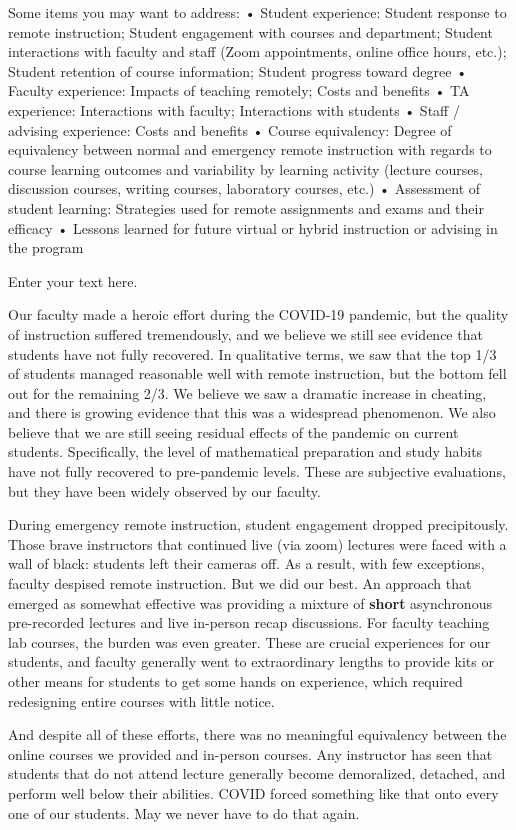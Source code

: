 \documentclass[12pt]{article}
\begin{document}
Some items you may want to address:
    • Student experience: Student response to remote instruction; Student engagement with courses and department; Student interactions with faculty and staff (Zoom appointments, online office hours, etc.); Student retention of course information; Student progress toward degree
    • Faculty experience: Impacts of teaching remotely; Costs and benefits
    • TA experience: Interactions with faculty; Interactions with students
    • Staff / advising experience: Costs and benefits
    • Course equivalency: Degree of equivalency between normal and emergency remote instruction with regards to course learning outcomes and variability by learning activity (lecture courses, discussion courses, writing courses, laboratory courses, etc.)
    • Assessment of student learning: Strategies used for remote assignments and exams and their efficacy
    • Lessons learned for future virtual or hybrid instruction or advising in the program

Enter your text here.

Our faculty made a heroic effort during the COVID-19 pandemic, but the quality of instruction suffered tremendously, and we believe we still see evidence that students have not fully recovered.  In qualitative terms, we saw that the top 1/3 of students managed reasonable well with remote instruction, but the bottom fell out for the remaining 2/3.  We believe we saw a dramatic increase in cheating, and there is growing evidence that this was a widespread phenomenon.  We also believe that we are still seeing residual effects of the pandemic on current students.  Specifically, the level of mathematical preparation and study habits have not fully recovered to pre-pandemic levels.  These are subjective evaluations, but they have been widely observed by our faculty.

During emergency remote instruction, student engagement dropped precipitously.  Those brave instructors that continued live (via zoom) lectures were faced with a wall of black: students left their cameras off.  As a result, with few exceptions, faculty despised remote instruction.  But we did our best.  An approach that emerged as somewhat effective was providing a mixture of {\bf short} asynchronous pre-recorded lectures and live in-person recap discussions.  For faculty teaching lab courses, the burden was even greater.  These are crucial experiences for our students, and faculty generally went to extraordinary lengths to provide kits or other means for students to get some hands on experience, which required redesigning entire courses with little notice.  

And despite all of these efforts, there was no meaningful equivalency between the online courses we provided and in-person courses.  Any instructor has seen that students that do not attend lecture generally become demoralized, detached, and perform well below their abilities.  COVID forced something like that onto every one of our students.  May we never have to do that again.
\end{document}
